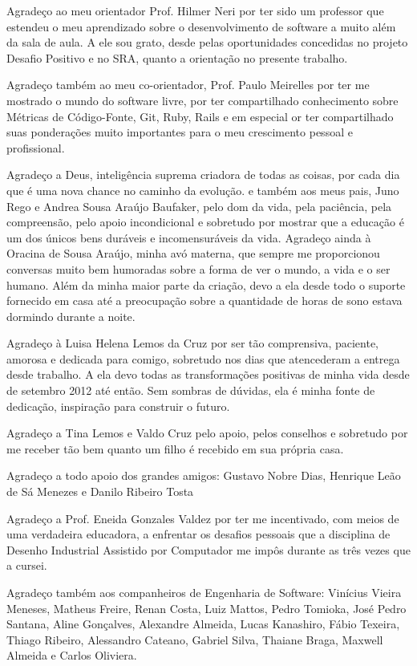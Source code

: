 \begin{agradecimentos}
Agradeço ao meu orientador Prof. Hilmer Neri por ter sido um professor que estendeu o meu aprendizado sobre o desenvolvimento de software a muito além da sala de aula. A ele sou grato, desde pelas oportunidades concedidas no projeto Desafio Positivo e no SRA, quanto a orientação no presente trabalho. 

Agradeço também ao meu co-orientador, Prof. Paulo Meirelles por ter me mostrado o mundo do software livre, por ter compartilhado conhecimento sobre Métricas de Código-Fonte, Git, Ruby, Rails e em especial or ter compartilhado suas ponderações muito importantes para o meu crescimento pessoal e profissional.

Agradeço a Deus, inteligência suprema criadora de todas as coisas, por cada dia que é uma nova chance no caminho da evolução.  e também aos meus pais, Juno Rego e Andrea Sousa Araújo Baufaker, pelo dom da vida, pela paciência, pela compreensão, pelo apoio incondicional e sobretudo por mostrar que a educação é um dos únicos bens duráveis e incomensuráveis da vida. Agradeço ainda à Oracina de Sousa Araújo, minha avó materna, que sempre me proporcionou conversas muito bem humoradas sobre a forma de ver o mundo, a vida e o ser humano. Além da minha maior parte da criação, devo a ela desde todo o suporte fornecido em casa até a preocupação sobre a quantidade de horas de sono estava dormindo durante a noite.

Agradeço à Luisa Helena Lemos da Cruz por ser tão comprensiva, paciente, amorosa e dedicada para comigo, sobretudo nos dias que atencederam a entrega desde trabalho. A ela devo todas as transformações positivas de minha vida desde de setembro 2012 até então. Sem sombras de dúvidas, ela é minha fonte de dedicação, inspiração para construir o futuro. 

Agradeço a Tina Lemos e Valdo Cruz pelo apoio, pelos conselhos e sobretudo por me receber tão bem quanto um filho é recebido em sua própria casa.

Agradeço a todo apoio dos grandes amigos: Gustavo Nobre Dias, Henrique Leão de Sá Menezes e Danilo Ribeiro Tosta


Agradeço a Prof. Eneida Gonzales Valdez por ter me incentivado, com meios de uma verdadeira educadora, a enfrentar os desafios pessoais que a disciplina de Desenho Industrial Assistido por Computador me impôs durante as três vezes que a cursei.

Agradeço também aos companheiros de Engenharia de Software: Vinícius Vieira Meneses, Matheus Freire, Renan Costa, Luiz Mattos, Pedro Tomioka, José Pedro Santana, Aline Gonçalves, Alexandre Almeida, Lucas Kanashiro, Fábio Texeira, Thiago Ribeiro, Alessandro Cateano, Gabriel Silva, Thaiane Braga, Maxwell Almeida e Carlos Oliviera. 

\end{agradecimentos}
